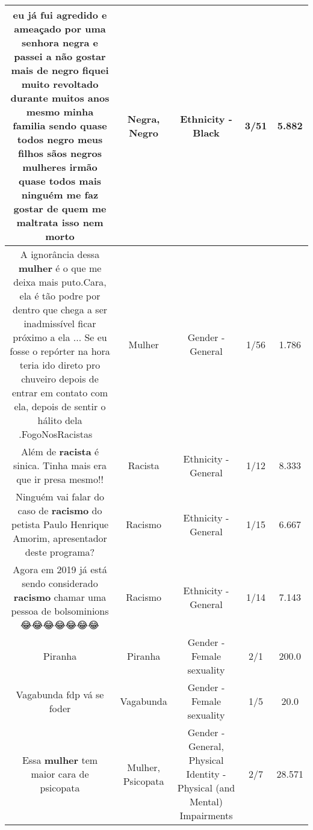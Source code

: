 \documentclass[11pt]{article}
\newlength\mylength
\begin{document}
\begin{center}
\begin{longtable}{|C{.65\mylength}|C{.30\mylength}|C{.12\mylength}|C{.12\mylength}|C{.12\mylength}|}
  \small eu já fui agredido e ameaçado por uma senhora \textbf{negra} e passei a não gostar mais de \textbf{negro} fiquei muito revoltado durante muitos anos mesmo minha familia sendo quase todos \textbf{negro} meus filhos sãos negros mulheres irmão quase todos mais ninguém me faz gostar de quem me maltrata isso nem morto\normalsize   & Negra, Negro & Ethnicity - Black & 3/51 & 5.882 \\  \hline
  \small A ignorância dessa \textbf{mulher} é o que me deixa mais puto.Cara, ela é tão podre por dentro que chega a ser inadmissível ficar próximo a ela ... Se eu fosse o repórter na hora teria ido direto pro chuveiro depois de entrar em contato com ela, depois de sentir o hálito dela .FogoNosRacistas 🖕🏼\normalsize   & Mulher & Gender - General & 1/56 & 1.786 \\  \hline
  \small Além de \textbf{racista} é sinica. Tinha mais era que ir presa mesmo!!\normalsize   & Racista & Ethnicity - General & 1/12 & 8.333 \\  \hline
  \small Ninguém vai falar do caso de \textbf{racismo} do petista Paulo Henrique Amorim, apresentador deste programa?\normalsize   & Racismo & Ethnicity - General & 1/15 & 6.667 \\  \hline
  \small Agora em 2019 já está sendo considerado \textbf{racismo} chamar uma pessoa de bolsominions 😂😂😂😂😂😂😂\normalsize   & Racismo & Ethnicity - General & 1/14 & 7.143 \\  \hline
  \small Piranha\normalsize   & Piranha & Gender - Female sexuality & 2/1 & 200.0 \\  \hline
  \small Vagabunda fdp vá se foder\normalsize   & Vagabunda & Gender - Female sexuality & 1/5 & 20.0 \\  \hline
  \small Essa \textbf{mulher} tem maior cara de psicopata\normalsize   & Mulher, Psicopata & Gender - General, Physical Identity - Physical (and Mental) Impairments & 2/7 & 28.571 \\  \hline

\end{longtable}
\end{center}
\end{document}
